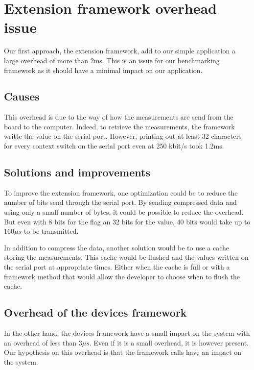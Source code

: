 \section{Extension framework overhead issue\label{sec:overhead}}

Our first approach, the extension framework, add to our simple application a large overhead of more than 2ms.
This is an issue for our benchmarking framework as it should have a minimal impact on our application.

\subsection{Causes}

This overhead is due to the way of how the measurements are send from the board to the computer.
Indeed, to retrieve the measurements, the framework writte the value on the serial port.
However, printing out at least 32 characters for every context switch on the serial port even at 250 kbit/s took 1.2ms.

\subsection{Solutions and improvements}

To improve the extension framework, one optimization could be to reduce the number of bits send through the serial port.
By sending compressed data and using only a small number of bytes, it could be possible to reduce the overhead.
But even with 8 bits for the flag an 32 bits for the value, 40 bits would take up to $160\mu s$ to be transmitted.

In addition to compress the data, another solution would be to use a cache storing the measurements.
This cache would be flushed and the values written on the serial port at appropriate times.
Either when the cache is full or with a framework method that would allow the developer to choose when to flush the cache.

\subsection{Overhead of the devices framework}

In the other hand, the devices framework have a small impact on the system with an overhead of less than $3\mu s$.
Even if it is a small overhead, it is however present.
Our hypothesis on this overhead is that the framework calls have an impact on the system. %